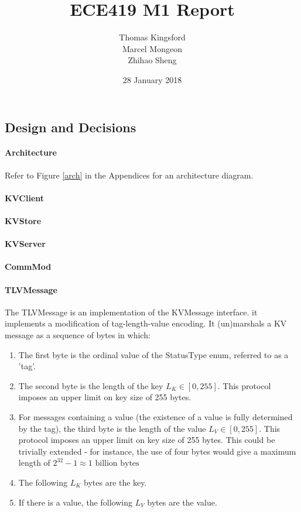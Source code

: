 \documentclass[12pt]{article}
\title{ECE419 M1 Report}
\date{28 January 2018}
\author{Thomas Kingsford\\Marcel Mongeon\\Zhihao Sheng}
\begin{document}
\begin{multicols}{2}
\maketitle

\section{Design and Decisions}

\paragraph{Architecture} Refer to Figure \ref{arch} in the Appendices for an architecture diagram.

\paragraph{KVClient} 

\paragraph{KVStore}

\paragraph{KVServer}

\paragraph{CommMod}

\paragraph{TLVMessage} The TLVMessage is an implementation of the KVMessage interface. it implements a modification of tag-length-value encoding. It (un)marshals a KV message as a sequence of bytes in which:

\begin{enumerate}
\item The first byte is the ordinal value of the StatusType enum, referred to as a 'tag'.
\item The second byte is the length of the key $L_K \in [0, 255]$. This protocol imposes an upper limit on key size of 255 bytes.
\item For messages containing a value (the existence of a value is fully determined by the tag), the third byte is the length of the value $L_V \in [0, 255]$. This protocol imposes an upper limit on key size of 255 bytes. This could be trivially extended - for instance, the use of four bytes would give a maximum length of $2^32-1\approx 1 \text{ billion bytes}$
\item The following $L_K$ bytes are the key.
\item If there is a value, the following $L_V$ bytes are the value.
\end{enumerate}


\end{multicols}
\end{document}
